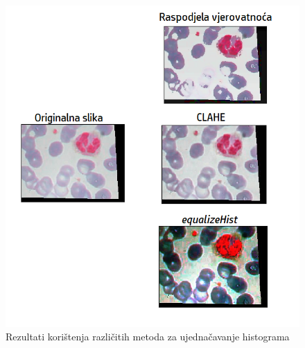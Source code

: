 \documentclass[12pt,a4paper]{article}
\begin{document}
\begin{figure}[H]

\center
\includegraphics[scale=0.9]{slikaHistogram.png}
\caption{Rezultati korištenja različitih metoda za ujednačavanje histograma}
	
\end{figure}
\end{document}
